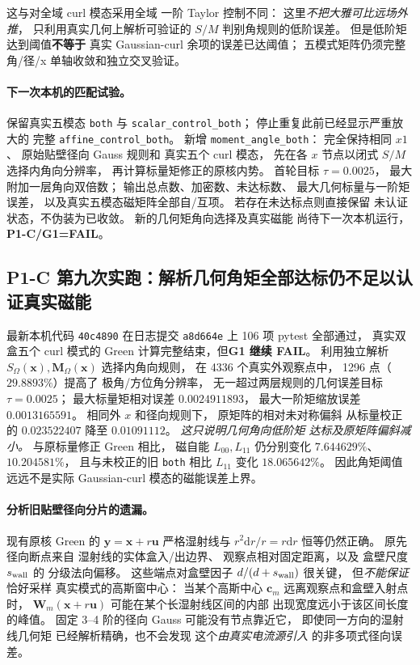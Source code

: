这与对全域 curl 模态采用全域
一阶 Taylor 控制不同：
这里\emph{不把大雅可比远场外推}，
只利用真实几何上解析可验证的
$S/M$ 判别角规则的低阶误差。
但是低阶矩达到阈值\textbf{不等于}
真实 Gaussian-curl 余项的误差已达阈值；
五模式矩阵仍须完整角/径/x
单轴收敛和独立交叉验证。

\paragraph{下一次本机的匹配试验。}
保留真实五模态
\texttt{both} 与
\texttt{scalar\_control\_both}；
停止重复此前已经显示严重放大的
完整 \texttt{affine\_control\_both}。
新增 \texttt{moment\_angle\_both}：
完全保持相同 $x1$、
原始贴壁径向 Gauss 规则和
真实五个 curl 模态，
先在各 $x$ 节点以闭式 $S/M$
选择内角向分辨率，
再计算标量矩修正的原核内势。
首轮目标 $\tau=0.0025$，
最大附加一层角向双倍数；
输出总点数、加密数、未达标数、
最大几何标量与一阶矩误差，
以及真实五模态磁矩阵全部自/互项。
若存在未达标点则直接保留
未认证状态，不伪装为已收敛。
新的几何矩角向选择及真实磁能
尚待下一次本机运行，
\textbf{P1-C/G1=FAIL}。


\subsection{P1-C 第九次实跑：解析几何角矩全部达标仍不足以认证真实磁能}
\label{sec:p1-c-mode-projected-radial-panels}
最新本机代码 \texttt{40c4890}
在日志提交 \texttt{a8d664e} 上
106 项 pytest 全部通过，
真实双盒五个 curl 模式的 Green
计算完整结束，但\textbf{G1 继续 FAIL}。
利用独立解析
$S_\Omega(\bm x),\bm M_\Omega(\bm x)$
选择内角向规则，
在 4336 个真实外观察点中，
1296 点（$29.8893\%$）提高了
极角/方位角分辨率，
无一超过两层规则的几何误差目标
$\tau=0.0025$；
最大标量矩相对误差
$0.0024911893$，
最大一阶矩缩放误差
$0.0013165591$。
相同外 $x$ 和径向规则下，
原矩阵的相对未对称偏斜
从标量校正的 $0.023522407$
降至 $0.01091112$。
\emph{这只说明几何角向低阶矩
达标及原矩阵偏斜减小。}
与原标量修正 Green 相比，
磁自能 $L_{00},L_{11}$
仍分别变化 $7.644629\%$、
$10.204581\%$，
且与未校正的旧 \texttt{both}
相比 $L_{11}$ 变化 $18.065642\%$。
因此角矩阈值远远不是实际
Gaussian-curl 模态的磁能误差上界。

\paragraph{分析旧贴壁径向分片的遗漏。}
现有原核 Green 的
$\bm y=\bm x+r\bm u$
严格湿射线与
$r^2\mathrm dr/r=r\mathrm dr$
恒等仍然正确。
原先径向断点来自
湿射线的实体盒入/出边界、
观察点相对固定距离，以及
盒壁尺度 $s_{\rm wall}$ 的
分级法向偏移。
这些端点对盒壁因子
$d/(d+s_{\rm wall})$ 很关键，
但\emph{不能保证}恰好采样
真实模式的高斯窗中心：
当某个高斯中心 $\bm c_m$
远离观察点和盒壁入射点时，
$\bm W_m(\bm x+r\bm u)$
可能在某个长湿射线区间的内部
出现宽度远小于该区间长度的峰值。
固定 3--4 阶的径向 Gauss
可能没有节点靠近它，
即使同一方向的湿射线几何矩
已经解析精确，也不会发现
这个\emph{由真实电流源引入}
的非多项式径向误差。

